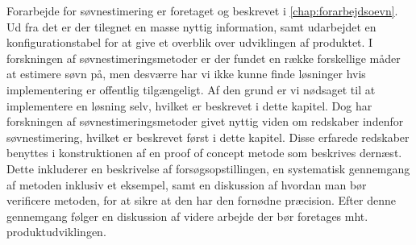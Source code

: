 Forarbejde for søvnestimering er foretaget og beskrevet i \cref{chap:forarbejdsoevn}.
Ud fra det er der tilegnet en masse nyttig information, samt udarbejdet en konfigurationstabel for at give et overblik over udviklingen af produktet.
I forskningen af søvnestimeringsmetoder er der fundet en række forskellige måder at estimere søvn på, men desværre har vi ikke kunne finde løsninger hvis implementering er offentlig tilgængeligt.
Af den grund er vi nødsaget til at implementere en løsning selv, hvilket er beskrevet i dette kapitel.
Dog har forskningen af søvnestimeringsmetoder givet nyttig viden om redskaber indenfor søvnestimering, hvilket er beskrevet først i dette kapitel.
Disse erfarede redskaber benyttes i konstruktionen af en proof of concept metode som beskrives dernæst.
Dette inkluderer en beskrivelse af forsøgsopstillingen, en systematisk gennemgang af metoden inklusiv et eksempel, samt en diskussion af hvordan man bør verificere metoden, for at sikre at den har den fornødne præcision.
Efter denne gennemgang følger en diskussion af videre arbejde der bør foretages mht. produktudviklingen.








